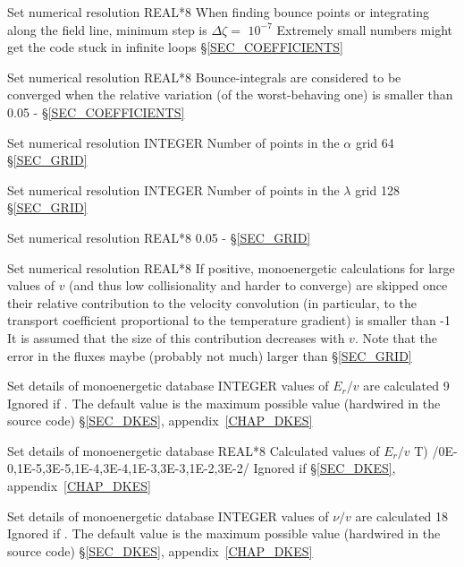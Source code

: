 {
{Set numerical resolution}
{REAL*8}
{When finding bounce points or integrating along the field line, minimum step is $\Delta\zeta=$}
{$10^{-7}$}
{Extremely small numbers might get the code stuck in infinite loops}
{\S\ref{SEC_COEFFICIENTS}}

{Set numerical resolution}
{REAL*8}
{Bounce-integrals are considered to be converged when the relative variation (of the worst-behaving one) is smaller than }
{0.05}
{-}
{\S\ref{SEC_COEFFICIENTS}}

{Set numerical resolution}
{INTEGER}
{Number of points in the $\alpha$ grid}
{64}
{}
{\S\ref{SEC_GRID}}

{Set numerical resolution}
{INTEGER}
{Number of points in the $\lambda$ grid}
{128}
{}
{\S\ref{SEC_GRID}}

{Set numerical resolution}
{REAL*8}
{}
{0.05}
{-}
{\S\ref{SEC_GRID}}

{Set numerical resolution}
{REAL*8}
If positive, monoenergetic calculations for large values of $v$ (and thus low collisionality and harder to converge) are skipped once their relative contribution to the velocity convolution (in particular, to the transport coefficient proportional to the temperature gradient) is smaller than 
{-1}
{It is assumed that the size of this contribution decreases with $v$. Note that the error in the fluxes maybe (probably not much) larger than }
{\S\ref{SEC_GRID}}

{Set details of monoenergetic database}
{INTEGER}
{ values of $E_r/v$ are calculated}
{9}%
{Ignored if \notf{}. The default value is the maximum possible value (hardwired in the source code)}
{\S\ref{SEC_DKES}, appendix~\ref{CHAP_DKES}}

{Set details of monoenergetic database}
{REAL*8}
{Calculated values of $E_r/v$ T)}
{/0E-0,1E-5,3E-5,1E-4,3E-4,1E-3,3E-3,1E-2,3E-2/}%
{Ignored if \notf{}}
{\S\ref{SEC_DKES}, appendix~\ref{CHAP_DKES}}

{Set details of monoenergetic database}
{INTEGER}
{ values of $\nu/v$ are calculated}
{18}
{Ignored if \notf{}. The default value is the maximum possible value (hardwired in the source code)}
{\S\ref{SEC_DKES}, appendix~\ref{CHAP_DKES}}

}
